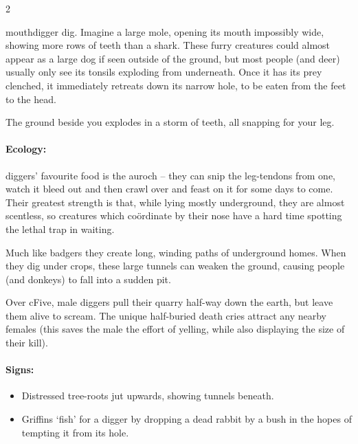 \begin{multicols}{2}
\begin{itemize}
\end{itemize}

  {mouthdigger}%
dig.
Imagine a large mole, opening its mouth impossibly wide, showing more rows of teeth than a shark.
These furry creatures could almost appear as a large dog if seen outside of the ground, but most people (and deer) usually only see its tonsils exploding from underneath.
Once it has its prey clenched, it immediately retreats down its narrow hole, to be eaten from the feet to the head.

\begin{boxtext}
  The ground beside you explodes in a storm of teeth, all snapping for your leg.
\end{boxtext}

\paragraph{Ecology:} \Glspl{digger}' favourite food is the auroch -- they can snip the leg-tendons from one, watch it bleed out and then crawl over and feast on it for some days to come.
Their greatest strength is that, while lying mostly underground, they are almost scentless, so creatures which co\"ordinate by their nose have a hard time spotting the lethal trap in waiting.

Much like badgers they create long, winding paths of underground homes.
When they dig under crops, these large tunnels can weaken the ground, causing people (and donkeys) to fall into a sudden pit.

Over \gls{cFive}, male \glspl{digger} pull their quarry half-way down the earth, but leave them alive to scream.
The unique half-buried death cries attract any nearby females (this saves the male the effort of yelling, while also displaying the size of their kill).

\medbreak

\paragraph{Signs:}
\begin{itemize}
  \item
  Distressed tree-roots jut upwards, showing tunnels beneath.
  \item
  Griffins `fish' for a digger by dropping a dead rabbit by a bush in the hopes of tempting it from its hole.
\end{itemize}


\end{multicols}
